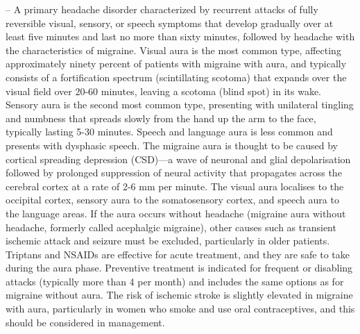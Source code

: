 -- A primary headache disorder characterized by recurrent attacks of fully reversible visual, sensory, or speech symptoms that develop gradually over at least five minutes and last no more than sixty minutes, followed by headache with the characteristics of migraine. Visual aura is the most common type, affecting approximately ninety percent of patients with migraine with aura, and typically consists of a fortification spectrum (scintillating scotoma) that expands over the visual field over 20-60 minutes, leaving a scotoma (blind spot) in its wake. Sensory aura is the second most common type, presenting with unilateral tingling and numbness that spreads slowly from the hand up the arm to the face, typically lasting 5-30 minutes. Speech and language aura is less common and presents with dysphasic speech. The migraine aura is thought to be caused by cortical spreading depression (CSD)—a wave of neuronal and glial depolarisation followed by prolonged suppression of neural activity that propagates across the cerebral cortex at a rate of 2-6 mm per minute. The visual aura localises to the occipital cortex, sensory aura to the somatosensory cortex, and speech aura to the language areas. If the aura occurs without headache (migraine aura without headache, formerly called acephalgic migraine), other causes such as transient ischemic attack and seizure must be excluded, particularly in older patients. Triptans and NSAIDs are effective for acute treatment, and they are safe to take during the aura phase. Preventive treatment is indicated for frequent or disabling attacks (typically more than 4 per month) and includes the same options as for migraine without aura. The risk of ischemic stroke is slightly elevated in migraine with aura, particularly in women who smoke and use oral contraceptives, and this should be considered in management.

